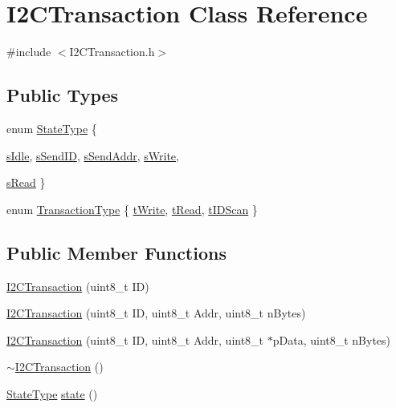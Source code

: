 \hypertarget{class_i2_c_transaction}{
\section{I2CTransaction Class Reference}
\label{class_i2_c_transaction}
}


{\ttfamily \#include $<$I2CTransaction.h$>$}

\subsection*{Public Types}
\begin{DoxyCompactItemize}
\item 
enum \hyperlink{class_i2_c_transaction_ac9b45f04b6b09e815d88b0a516a4446f}{StateType} \{ \par
\hyperlink{class_i2_c_transaction_ac9b45f04b6b09e815d88b0a516a4446faa828ace844e5f7ecec483496f37459b5}{sIdle}, 
\hyperlink{class_i2_c_transaction_ac9b45f04b6b09e815d88b0a516a4446fa63ea5eb4a0a62b8a4a237badf4d9463b}{sSendID}, 
\hyperlink{class_i2_c_transaction_ac9b45f04b6b09e815d88b0a516a4446fa0b8f329c3c3c143c29fecf1328529692}{sSendAddr}, 
\hyperlink{class_i2_c_transaction_ac9b45f04b6b09e815d88b0a516a4446fa46b087426b19cab99c02a5fa01292f64}{sWrite}, 
\par
\hyperlink{class_i2_c_transaction_ac9b45f04b6b09e815d88b0a516a4446fa789e39ddceca595f12798e522aca6a25}{sRead}
 \}
\item 
enum \hyperlink{class_i2_c_transaction_a743bc8172b552e938eaee7c8ce3fe954}{TransactionType} \{ \hyperlink{class_i2_c_transaction_a743bc8172b552e938eaee7c8ce3fe954af23ada7d0de7976bc0199107e040d9d4}{tWrite}, 
\hyperlink{class_i2_c_transaction_a743bc8172b552e938eaee7c8ce3fe954aa2aafaccef30332edcb253e266c0dc03}{tRead}, 
\hyperlink{class_i2_c_transaction_a743bc8172b552e938eaee7c8ce3fe954ac2ccb7ede7c62ad2b3bf82b7144bf6df}{tIDScan}
 \}
\end{DoxyCompactItemize}
\subsection*{Public Member Functions}
\begin{DoxyCompactItemize}
\item 
\hyperlink{class_i2_c_transaction_a641b9323acdca47fb0921f11b86f09bf}{I2CTransaction} (uint8\_\-t ID)
\item 
\hyperlink{class_i2_c_transaction_a322719d06a89a7c7c55ab8ced4db93ee}{I2CTransaction} (uint8\_\-t ID, uint8\_\-t Addr, uint8\_\-t nBytes)
\item 
\hyperlink{class_i2_c_transaction_a45df817ef6dc63877d17ff66978d3a5e}{I2CTransaction} (uint8\_\-t ID, uint8\_\-t Addr, uint8\_\-t $\ast$pData, uint8\_\-t nBytes)
\item 
\hyperlink{class_i2_c_transaction_a982ccf2b98baad291ccefe89b7889e59}{$\sim$I2CTransaction} ()
\item 
\hyperlink{class_i2_c_transaction_ac9b45f04b6b09e815d88b0a516a4446f}{StateType} \hyperlink{class_i2_c_transaction_aaf612ee96d10927772a7d16f55265eff}{state} ()
\end{DoxyCompactItemize}
